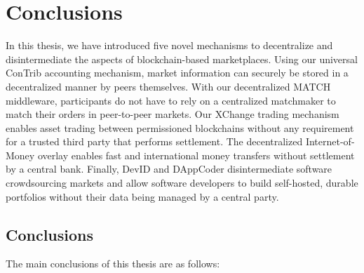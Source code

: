 \chapter{Conclusions}
\label{conclusion}

In this thesis, we have introduced five novel mechanisms to decentralize and disintermediate the aspects of blockchain-based marketplaces.
Using our universal ConTrib accounting mechanism, market information can securely be stored in a decentralized manner by peers themselves.
With our decentralized MATCH middleware, participants do not have to rely on a centralized matchmaker to match their orders in peer-to-peer markets.
Our XChange trading mechanism enables asset trading between permissioned blockchains without any requirement for a trusted third party that performs settlement.
The decentralized Internet-of-Money overlay enables fast and international money transfers without settlement by a central bank.
Finally, DevID and DAppCoder disintermediate software crowdsourcing markets and allow software developers to build self-hosted, durable portfolios without their data being managed by a central party.

\section{Conclusions}
The main conclusions of this thesis are as follows:

